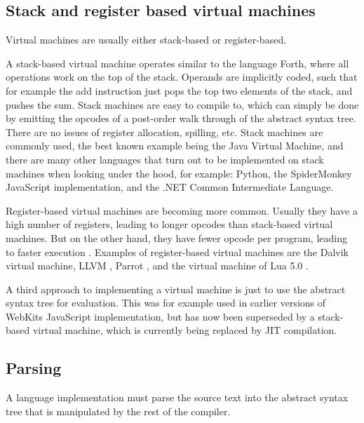 \documentclass[11pt]{report}
\begin{document}

\subsection{Stack and register based virtual machines}
Virtual machines are usually either stack-based or register-based.

A stack-based virtual machine operates similar to the language Forth, where all operations work on the top of the stack. 
Operands are implicitly coded, such that for example the add instruction just pops the top two elements of the stack, and pushes the sum. 
Stack machines are easy to compile to, 
which can simply be done by emitting the opcodes of a post-order walk through of the abstract syntax tree. 
There are no issues of register allocation, spilling, etc.
Stack machines are commonly used, the best known example being the Java Virtual Machine, and there are many other languages that turn out to be implemented on stack machines when looking under the hood, for example: Python, the SpiderMonkey JavaScript implementation, and the .NET Common Intermediate Language.

Register-based virtual machines are becoming more common. 
Usually they have a high number of registers, leading to longer opcodes than stack-based virtual machines. But on the other hand, they have fewer opcode per program, leading to faster execution \cite{register-vs-stack1, register-vs-stack2}. 
Examples of register-based virtual machines are the Dalvik \cite{dalvik-vm} virtual machine, LLVM \cite{llvm}, Parrot \cite{parrot}, and the virtual machine of Lua 5.0 \cite{lua-vm}.

A third approach to implementing a virtual machine is just to use the abstract syntax tree for evaluation. This was for example used in earlier versions of WebKits JavaScript implementation, but has now been superseded by a stack-based virtual machine, which is currently being replaced by JIT compilation.

\subsection{Parsing}
A language implementation must parse the source text into the abstract syntax tree that is manipulated by the rest of the compiler.
\end{document}
